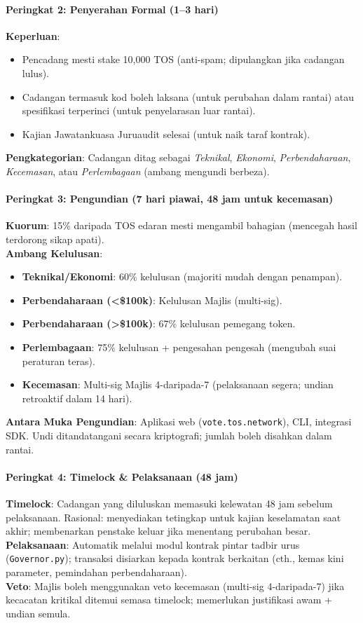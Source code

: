 \documentclass[11pt]{article}
\begin{document}
\paragraph{Peringkat 2: Penyerahan Formal (1--3 hari)}
\textbf{Keperluan}:
\begin{itemize}[noitemsep]
  \item Pencadang mesti stake 10,000 TOS (anti-spam; dipulangkan jika cadangan lulus).
  \item Cadangan termasuk kod boleh laksana (untuk perubahan dalam rantai) atau spesifikasi terperinci (untuk penyelarasan luar rantai).
  \item Kajian Jawatankuasa Juruaudit selesai (untuk naik taraf kontrak).
\end{itemize}
\textbf{Pengkategorian}: Cadangan ditag sebagai \emph{Teknikal}, \emph{Ekonomi}, \emph{Perbendaharaan}, \emph{Kecemasan}, atau \emph{Perlembagaan} (ambang mengundi berbeza).

\paragraph{Peringkat 3: Pengundian (7 hari piawai, 48 jam untuk kecemasan)}
\textbf{Kuorum}: 15\% daripada TOS edaran mesti mengambil bahagian (mencegah hasil terdorong sikap apati).\\
\textbf{Ambang Kelulusan}:
\begin{itemize}[noitemsep]
  \item \textbf{Teknikal/Ekonomi}: 60\% kelulusan (majoriti mudah dengan penampan).
  \item \textbf{Perbendaharaan (<\$100k)}: Kelulusan Majlis (multi-sig).
  \item \textbf{Perbendaharaan (>\$100k)}: 67\% kelulusan pemegang token.
  \item \textbf{Perlembagaan}: 75\% kelulusan + pengesahan pengesah (mengubah suai peraturan teras).
  \item \textbf{Kecemasan}: Multi-sig Majlis 4-daripada-7 (pelaksanaan segera; undian retroaktif dalam 14 hari).
\end{itemize}
\textbf{Antara Muka Pengundian}: Aplikasi web (\texttt{vote.tos.network}), CLI, integrasi SDK. Undi ditandatangani secara kriptografi; jumlah boleh disahkan dalam rantai.

\paragraph{Peringkat 4: Timelock \& Pelaksanaan (48 jam)}
\textbf{Timelock}: Cadangan yang diluluskan memasuki kelewatan 48 jam sebelum pelaksanaan. Rasional: menyediakan tetingkap untuk kajian keselamatan saat akhir; membenarkan penstake keluar jika menentang perubahan besar.\\
\textbf{Pelaksanaan}: Automatik melalui modul kontrak pintar tadbir urus (\texttt{Governor.py}); transaksi disiarkan kepada kontrak berkaitan (cth., kemas kini parameter, pemindahan perbendaharaan).\\
\textbf{Veto}: Majlis boleh menggunakan veto kecemasan (multi-sig 4-daripada-7) jika kecacatan kritikal ditemui semasa timelock; memerlukan justifikasi awam + undian semula.
\end{document}
